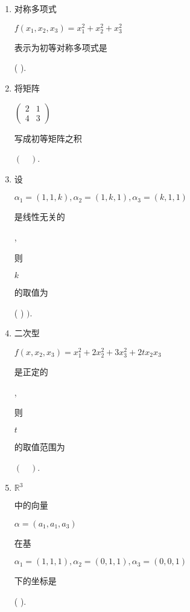 \documentclass[10pt]{article}
\begin{document}
\begin{enumerate}
  \item \begin{CJK}{UTF8}{mj}对称多项式\end{CJK} $f\left(x_{1}, x_{2}, x_{3}\right)=x_{1}^{2}+x_{2}^{2}+x_{3}^{2}$ \begin{CJK}{UTF8}{mj}表示为初等对称多项式是\end{CJK} ( ).

  \item \begin{CJK}{UTF8}{mj}将矩阵\end{CJK} $\left(\begin{array}{ll}2 & 1 \\ 4 & 3\end{array}\right)$ \begin{CJK}{UTF8}{mj}写成初等矩阵之积\end{CJK} $(\quad)$.

  \item \begin{CJK}{UTF8}{mj}设\end{CJK} $\alpha_{1}=(1,1, k), \alpha_{2}=(1, k, 1), \alpha_{3}=(k, 1,1)$ \begin{CJK}{UTF8}{mj}是线性无关的\end{CJK}, \begin{CJK}{UTF8}{mj}则\end{CJK} $k$ \begin{CJK}{UTF8}{mj}的取值为\end{CJK} ( ) $)$.

  \item \begin{CJK}{UTF8}{mj}二次型\end{CJK} $f\left(x, x_{2}, x_{3}\right)=x_{1}^{2}+2 x_{2}^{2}+3 x_{3}^{2}+2 t x_{2} x_{3}$ \begin{CJK}{UTF8}{mj}是正定的\end{CJK}, \begin{CJK}{UTF8}{mj}则\end{CJK} $t$ \begin{CJK}{UTF8}{mj}的取值范围为\end{CJK} $(\quad)$.

  \item $\mathbb{R}^{3}$ \begin{CJK}{UTF8}{mj}中的向量\end{CJK} $\alpha=\left(a_{1}, a_{1}, a_{3}\right)$ \begin{CJK}{UTF8}{mj}在基\end{CJK} $\alpha_{1}=(1,1,1), \alpha_{2}=(0,1,1), \alpha_{3}=(0,0,1)$ \begin{CJK}{UTF8}{mj}下的坐标是\end{CJK} ( ).


\end{enumerate}
\end{document}
